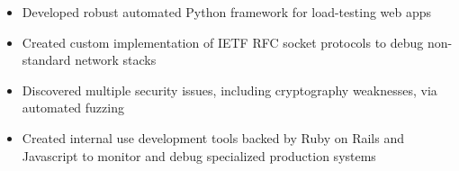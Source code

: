 \documentclass[10pt,a4paper]{altacv}
\newenvironment{tightitemize} %
{\begin{itemize}\itemsep1pt \parskip0pt \parsep0pt}
{\end{itemize}\vspace{-\topsep}}
\begin{document}
\smallskip
\divider

\begin{tightitemize}
    \item Developed robust automated Python framework for load-testing web apps
    \item Created custom implementation of IETF RFC socket protocols to debug 
        non-standard network stacks
    \item Discovered multiple security issues, including cryptography 
        weaknesses, via automated fuzzing
\end{tightitemize}

\smallskip
\divider

\begin{tightitemize}
\item Created internal use development tools backed by Ruby on Rails 
    and Javascript to monitor and debug specialized production systems
\end{tightitemize}










\end{document}
